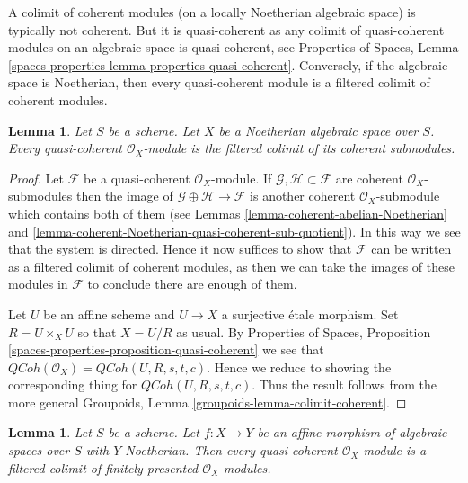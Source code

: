 \documentclass{stacks-project}
\theoremstyle{plain}
\newtheorem{lemma}[subsection]{Lemma}
\theoremstyle{definition}
\theoremstyle{remark}
\numberwithin{equation}{subsection}
\def\QCoh{\mathit{QCoh}}
\begin{document}
\noindent
A colimit of coherent modules (on a locally Noetherian
algebraic space) is typically not coherent. But it is quasi-coherent
as any colimit of quasi-coherent modules on an algebraic space is
quasi-coherent, see Properties of Spaces, Lemma
\ref{spaces-properties-lemma-properties-quasi-coherent}.
Conversely, if the algebraic space is Noetherian, then every quasi-coherent
module is a filtered colimit of coherent modules.

\begin{lemma}
\label{lemma-directed-colimit-coherent}
Let $S$ be a scheme. Let $X$ be a Noetherian algebraic space over $S$.
Every quasi-coherent $\mathcal{O}_X$-module is the filtered colimit
of its coherent submodules.
\end{lemma}

\begin{proof}
Let $\mathcal{F}$ be a quasi-coherent $\mathcal{O}_X$-module.
If $\mathcal{G}, \mathcal{H} \subset \mathcal{F}$ are coherent
$\mathcal{O}_X$-submodules then the image of
$\mathcal{G} \oplus \mathcal{H} \to \mathcal{F}$ is another
coherent $\mathcal{O}_X$-submodule which contains both of them
(see Lemmas \ref{lemma-coherent-abelian-Noetherian} and
\ref{lemma-coherent-Noetherian-quasi-coherent-sub-quotient}).
In this way we see that the system is directed.
Hence it now suffices to show that $\mathcal{F}$ can be written as
a filtered colimit of coherent modules, as then we can take the
images of these modules in $\mathcal{F}$ to conclude there are
enough of them.

\medskip\noindent
Let $U$ be an affine scheme and $U \to X$ a surjective \'etale morphism.
Set $R = U \times_X U$ so that $X = U/R$ as usual. By
Properties of Spaces, Proposition
\ref{spaces-properties-proposition-quasi-coherent}
we see that $\QCoh(\mathcal{O}_X) = \QCoh(U, R, s, t, c)$.
Hence we reduce to showing the corresponding thing for
$\QCoh(U, R, s, t, c)$. Thus the result follows from
the more general Groupoids, Lemma \ref{groupoids-lemma-colimit-coherent}.
\end{proof}

\begin{lemma}
\label{lemma-direct-colimit-finite-presentation}
Let $S$ be a scheme. Let $f : X \to Y$ be an affine morphism of algebraic
spaces over $S$ with $Y$ Noetherian. Then every quasi-coherent
$\mathcal{O}_X$-module is a filtered colimit of finitely presented
$\mathcal{O}_X$-modules.
\end{lemma}
\end{document}
